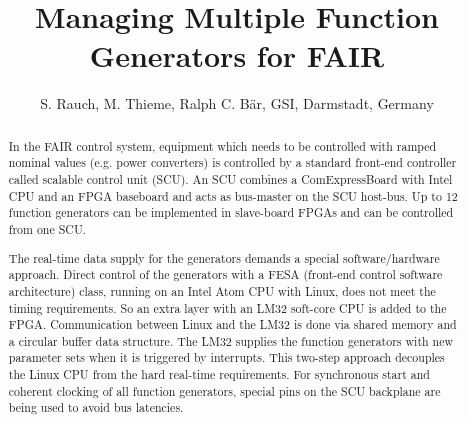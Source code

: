 \documentclass[a4paper,
              ]{jacow}
\begin{document}
\title{Managing Multiple Function Generators for FAIR}

\author{S. Rauch, M. Thieme, Ralph C. Bär, GSI,  Darmstadt, Germany}

\maketitle

%
\begin{abstract}
In the FAIR control system, equipment which needs to be controlled with ramped nominal values (e.g. power converters) is controlled by a standard front-end controller called scalable control unit (SCU). An SCU combines a ComExpressBoard with Intel CPU and an FPGA baseboard and acts as bus-master on the SCU host-bus. Up to 12 function generators can be implemented in slave-board FPGAs and can be controlled from one SCU.

The real-time data supply for the generators demands a special software/hardware approach. Direct control of the generators with a FESA (front-end control software architecture) class, running on an Intel Atom CPU with Linux, does not meet the timing requirements. So an extra layer with an LM32 soft-core CPU is added to the FPGA. Communication between Linux and the LM32 is done via shared memory and a circular buffer data structure. The LM32 supplies the function generators with new parameter sets when it is triggered by interrupts. This two-step approach decouples the Linux CPU from the hard real-time requirements. For synchronous start and coherent clocking of all function generators, special pins on the SCU backplane are being used to avoid bus latencies.\end{abstract}
\end{document}
